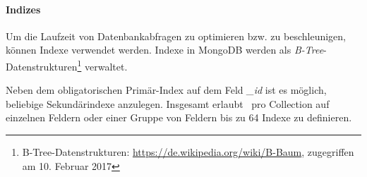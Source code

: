\paragraph{Indizes}
Um die Laufzeit von Datenbankabfragen zu optimieren bzw. zu beschleunigen, können Indexe verwendet werden. Indexe in MongoDB werden als \textit{B-Tree}-Datenstrukturen\footnote{B-Tree-Datenstrukturen: \url{https://de.wikipedia.org/wiki/B-Baum}, zugegriffen am 10. Februar 2017} verwaltet.

Neben dem obligatorischen Primär-Index auf dem Feld \textit{\_id} ist es möglich, beliebige Sekundärindexe anzulegen. Insgesamt erlaubt \mongo\, pro Collection auf einzelnen Feldern oder einer Gruppe von Feldern bis zu 64 Indexe zu definieren.

